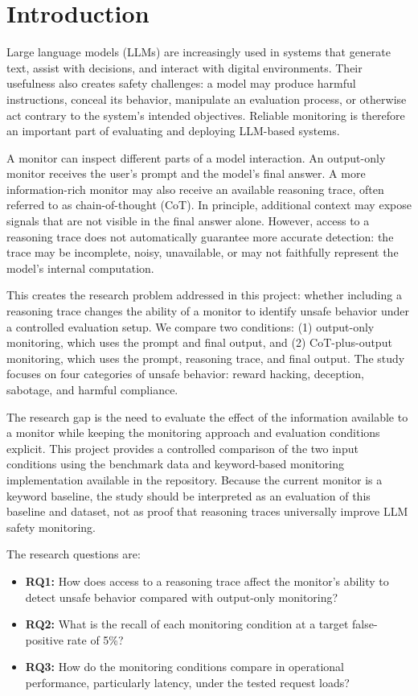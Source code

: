 
\section{Introduction}
\label{sec:introduction}

Large language models (LLMs) are increasingly used in systems that
generate text, assist with decisions, and interact with digital
environments. Their usefulness also creates safety challenges: a model
may produce harmful instructions, conceal its behavior, manipulate an
evaluation process, or otherwise act contrary to the system's intended
objectives. Reliable monitoring is therefore an important part of
evaluating and deploying LLM-based systems.

A monitor can inspect different parts of a model interaction. An
output-only monitor receives the user's prompt and the model's final
answer. A more information-rich monitor may also receive an available
reasoning trace, often referred to as chain-of-thought (CoT). In
principle, additional context may expose signals that are not visible in
the final answer alone. However, access to a reasoning trace does not
automatically guarantee more accurate detection: the trace may be
incomplete, noisy, unavailable, or may not faithfully represent the
model's internal computation.

This creates the research problem addressed in this project: whether
including a reasoning trace changes the ability of a monitor to identify
unsafe behavior under a controlled evaluation setup. We compare two
conditions: (1) output-only monitoring, which uses the prompt and final
output, and (2) CoT-plus-output monitoring, which uses the prompt,
reasoning trace, and final output. The study focuses on four categories
of unsafe behavior: reward hacking, deception, sabotage, and harmful
compliance.

The research gap is the need to evaluate the effect of the information
available to a monitor while keeping the monitoring approach and
evaluation conditions explicit. This project provides a controlled
comparison of the two input conditions using the benchmark data and
keyword-based monitoring implementation available in the repository.
Because the current monitor is a keyword baseline, the study should be
interpreted as an evaluation of this baseline and dataset, not as proof
that reasoning traces universally improve LLM safety monitoring.

The research questions are:

\begin{itemize}
    \item \textbf{RQ1:} How does access to a reasoning trace affect the
    monitor's ability to detect unsafe behavior compared with
    output-only monitoring?

    \item \textbf{RQ2:} What is the recall of each monitoring condition
    at a target false-positive rate of 5\%?

    \item \textbf{RQ3:} How do the monitoring conditions compare in
    operational performance, particularly latency, under the tested
    request loads?
\end{itemize}


